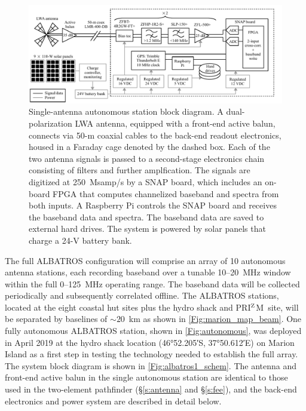 \documentclass{ws-jai}
\def\prizm{PRI$^{\rm Z}$M}
\begin{document}
\begin{figure}
  \begin{center}
    \includegraphics[width=\linewidth]{Figures/albatros_single_schematic/albatros_single_schematic.pdf}
    \caption{Single-antenna autonomous station block diagram.  A
      dual-polarization LWA antenna, equipped with a front-end active
      balun, connects via 50-m coaxial cables to the back-end readout
      electronics, housed in a Faraday cage denoted by the dashed box.
      Each of the two antenna signals is passed to a second-stage
      electronics chain consisting of filters and further
      amplfication.  The signals are digitized at 250~Msamp/s by a
      SNAP board, which includes an on-board FPGA that computes
      channelized baseband and spectra from both inputs.  A Raspberry
      Pi controls the SNAP board and receives the baseband data and
      spectra.  The baseband data are saved to external hard drives.
      The system is powered by solar panels that charge a 24-V battery
      bank.}
    \label{Fig:albatros1_schem}
  \end{center}
\end{figure}

The full ALBATROS configuration will comprise an array of 10
autonomous antenna stations, each recording baseband over a tunable
10--20~MHz window within the full 0--125~MHz operating range.  The
baseband data will be collected periodically and subsequently
correlated offline.  The ALBATROS stations, located at the eight
coastal hut sites plus the hydro shack and \prizm\ site, will be
separated by baselines of $\sim20$~km as shown in
\autoref{Fig:marion_map_beam}. One fully autonomous ALBATROS station,
shown in \autoref{Fig:autonomous}, was deployed in April 2019 at the
hydro shack location (\ang{46;52.205;}S, \ang{37;50.612;}E) on Marion
Island as a first step in testing the technology needed to establish
the full array.  The system block diagram is shown in
\autoref{Fig:albatros1_schem}.  The antenna and front-end active balun
in the single autonomous station are identical to those used in the
two-element pathfinder (\S\ref{s:antenna} and \S\ref{s:fee}), and the
back-end electronics and power system are described in detail below.
\end{document}
